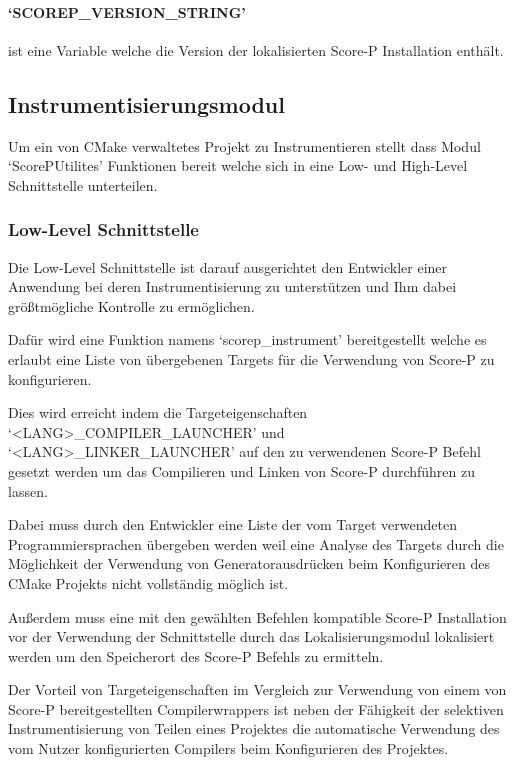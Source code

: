 \documentclass[german,proseminar,hyperref,utf8]{zihpub}
\begin{document}
    \paragraph{`SCOREP\_VERSION\_STRING'} ist eine Variable welche die Version der lokalisierten
    Score-P Installation enthält.

    \subsection{Instrumentisierungsmodul}
    Um ein von CMake verwaltetes Projekt zu Instrumentieren stellt dass Modul `ScorePUtilites'
    Funktionen bereit welche sich in eine Low- und High-Level Schnittstelle unterteilen.

    \subsubsection{Low-Level Schnittstelle}
    Die Low-Level Schnittstelle ist darauf ausgerichtet den Entwickler einer Anwendung bei deren
    Instrumentisierung zu unterstützen und Ihm dabei grö{\ss}tmögliche Kontrolle zu ermöglichen.

    Dafür wird eine Funktion namens `scorep\_instrument' bereitgestellt welche es erlaubt eine Liste
    von übergebenen Targets für die Verwendung von Score-P zu konfigurieren.

    Dies wird erreicht indem die Targeteigenschaften `<LANG>\_COMPILER\_LAUNCHER' und
    `<LANG>\_LINKER\_LAUNCHER' auf den zu verwendenen Score-P Befehl gesetzt werden um
    das Compilieren und Linken von Score-P durchführen zu lassen.

    Dabei muss durch den Entwickler eine Liste der vom Target verwendeten Programmiersprachen übergeben
    werden weil eine Analyse des Targets durch die Möglichkeit der Verwendung von Generatorausdrücken 
    beim Konfigurieren des CMake Projekts nicht vollständig möglich ist.

    Au{\ss}erdem muss eine mit den gewählten Befehlen kompatible Score-P Installation vor der Verwendung
    der Schnittstelle durch das Lokalisierungsmodul lokalisiert werden um den Speicherort des
    Score-P Befehls zu ermitteln.

    Der Vorteil von Targeteigenschaften im Vergleich zur Verwendung von einem von Score-P bereitgestellten
    Compilerwrappers ist neben der Fähigkeit der selektiven Instrumentisierung von Teilen eines Projektes
    die automatische Verwendung des vom Nutzer konfigurierten Compilers beim Konfigurieren des Projektes.
\end{document}
